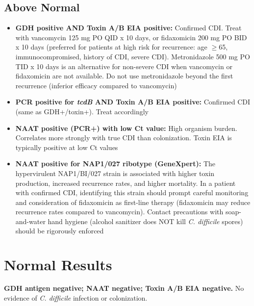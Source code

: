 \subsection*{Above Normal}
\begin{itemize}
  \item \textbf{GDH positive AND Toxin A/B EIA positive:} Confirmed CDI. Treat with vancomycin 125 mg PO QID x 10 days, or fidaxomicin 200 mg PO BID x 10 days (preferred for patients at high risk for recurrence: age $\geq$65, immunocompromised, history of CDI, severe CDI). Metronidazole 500 mg PO TID x 10 days is an alternative for non-severe CDI when vancomycin or fidaxomicin are not available. Do not use metronidazole beyond the first recurrence (inferior efficacy compared to vancomycin)
  \item \textbf{PCR positive for \textit{tcdB} AND Toxin A/B EIA positive:} Confirmed CDI (same as GDH+/toxin+). Treat accordingly
  \item \textbf{NAAT positive (PCR+) with low Ct value:} High organism burden. Correlates more strongly with true CDI than colonization. Toxin EIA is typically positive at low Ct values
  \item \textbf{NAAT positive for NAP1/027 ribotype (GeneXpert):} The hypervirulent NAP1/BI/027 strain is associated with higher toxin production, increased recurrence rates, and higher mortality. In a patient with confirmed CDI, identifying this strain should prompt careful monitoring and consideration of fidaxomicin as first-line therapy (fidaxomicin may reduce recurrence rates compared to vancomycin). Contact precautions with soap-and-water hand hygiene (alcohol sanitizer does NOT kill \textit{C. difficile} spores) should be rigorously enforced
\end{itemize}

\section*{Normal Results}
\textbf{GDH antigen negative; NAAT negative; Toxin A/B EIA negative.} No evidence of \textit{C. difficile} infection or colonization.

